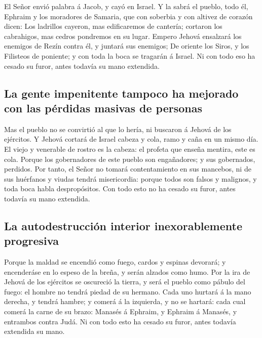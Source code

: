  El Señor envió palabra á Jacob, y cayó en Israel.
 Y la sabrá el pueblo, todo él, Ephraim y los moradores de
Samaria, que con soberbia y con altivez de corazón dicen:
 Los ladrillos cayeron, mas edificaremos de cantería;
cortaron los cabrahigos, mas cedros pondremos en su lugar.
 Empero Jehová ensalzará los enemigos de Rezín contra él,
y juntará sus enemigos;  De oriente los Siros, y los
Filisteos de poniente; y con toda la boca se tragarán á Israel. Ni con
todo eso ha cesado su furor, antes todavía su mano extendida.

\hypertarget{la-gente-impenitente-tampoco-ha-mejorado-con-las-puxe9rdidas-masivas-de-personas}{%
\subsection{La gente impenitente tampoco ha mejorado con las pérdidas
masivas de
personas}\label{la-gente-impenitente-tampoco-ha-mejorado-con-las-puxe9rdidas-masivas-de-personas}}

 Mas el pueblo no se convirtió al que lo hería, ni
buscaron á Jehová de los ejércitos.  Y Jehová cortará de
Israel cabeza y cola, ramo y caña en un mismo día.  El
viejo y venerable de rostro es la cabeza: el profeta que enseña mentira,
este es cola.  Porque los gobernadores de este pueblo son
engañadores; y sus gobernados, perdidos.  Por tanto, el
Señor no tomará contentamiento en sus mancebos, ni de sus huérfanos y
viudas tendrá misericordia: porque todos son falsos y malignos, y toda
boca habla despropósitos. Con todo esto no ha cesado su furor, antes
todavía su mano extendida.

\hypertarget{la-autodestrucciuxf3n-interior-inexorablemente-progresiva}{%
\subsection{La autodestrucción interior inexorablemente
progresiva}\label{la-autodestrucciuxf3n-interior-inexorablemente-progresiva}}

 Porque la maldad se encendió como fuego, cardos y
espinas devorará; y encenderáse en lo espeso de la breña, y serán
alzados como humo.  Por la ira de Jehová de los ejércitos
se oscureció la tierra, y será el pueblo como pábulo del fuego: el
hombre no tendrá piedad de su hermano.  Cada uno hurtará
á la mano derecha, y tendrá hambre; y comerá á la izquierda, y no se
hartará: cada cual comerá la carne de su brazo:  Manasés
á Ephraim, y Ephraim á Manasés, y entrambos contra Judá. Ni con todo
esto ha cesado su furor, antes todavía extendida su mano.


